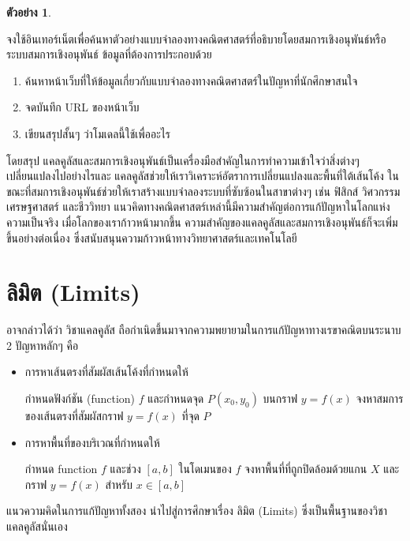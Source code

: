 \documentclass[
]{book}
\theoremstyle{definition}
\theoremstyle{definition}
\newtheorem{example}{ตัวอย่าง}[chapter]
\theoremstyle{definition}
\theoremstyle{definition}
\theoremstyle{remark}
\begin{document}
\begin{example}
\protect\hypertarget{exm:exm4}{}\label{exm:exm4}

จงใช้อินเทอร์เน็ตเพื่อค้นหาตัวอย่างแบบจำลองทางคณิตศาสตร์ที่อธิบายโดยสมการเชิงอนุพันธ์หรือระบบสมการเชิงอนุพันธ์ ข้อมูลที่ต้องการประกอบด้วย

\begin{enumerate}
\def\labelenumi{\arabic{enumi}.}
\item
  ค้นหาหน้าเว็บที่ให้ข้อมูลเกี่ยวกับแบบจำลองทางคณิตศาสตร์ในปัญหาที่นักศึกษาสนใจ
\item
  จดบันทึก URL ของหน้าเว็บ
\item
  เขียนสรุปสั้นๆ ว่าโมเดลนี้ใช้เพื่ออะไร
\end{enumerate}

\end{example}

โดยสรุป แคลคูลัสและสมการเชิงอนุพันธ์เป็นเครื่องมือสำคัญในการทำความเข้าใจว่าสิ่งต่างๆ เปลี่ยนแปลงไปอย่างไรและ แคลคูลัสช่วยให้เราวิเคราะห์อัตราการเปลี่ยนแปลงและพื้นที่ใต้เส้นโค้ง ในขณะที่สมการเชิงอนุพันธ์ช่วยให้เราสร้างแบบจำลองระบบที่ซับซ้อนในสาขาต่างๆ เช่น ฟิสิกส์ วิศวกรรม เศรษฐศาสตร์ และชีววิทยา แนวคิดทางคณิตศาสตร์เหล่านี้มีความสำคัญต่อการแก้ปัญหาในโลกแห่งความเป็นจริง เมื่อโลกของเราก้าวหน้ามากขึ้น ความสำคัญของแคลคูลัสและสมการเชิงอนุพันธ์ก็จะเพิ่มขึ้นอย่างต่อเนื่อง ซึ่งสนับสนุนความก้าวหน้าทางวิทยาศาสตร์และเทคโนโลยี

\chapter{ลิมิต (Limits)}\label{uxe25uxe21uxe15-limits}

อาจกล่าวได้ว่า วิชาแคลคูลัส
ถือกำเนิดขึ้นมาจากความพยายามในการแก้ปัญหาทางเรขาคณิตบนระนาบ 2 ปัญหาหลักๆ คือ

\begin{itemize}
\item
  การหาเส้นตรงที่สัมผัสเส้นโค้งที่กำหนดให้

  กำหนดฟังก์ชัน (function) \(f\) และกำหนดจุด \(P(x_{0},y_{0})\) บนกราฟ
  \(y = f(x)\) จงหาสมการของเส้นตรงที่สัมผัสกราฟ \(y = f(x)\) ที่จุด \(P\)
\item
  การหาพื้นที่ของบริเวณที่กำหนดให้

  กำหนด function \(f\) และช่วง \([a,b]\) ในโดเมนของ \(f\)
  จงหาพื้นที่ที่ถูกปิดล้อมด้วยแกน \(X\) และกราฟ \(y = f(x)\) สำหรับ \(x \in [a,b]\)
\end{itemize}

แนวความคิดในการแก้ปัญหาทั้งสอง นำไปสู่การศึกษาเรื่อง ลิมิต (Limits)
ซึ่งเป็นพื้นฐานของวิชาแคลคูลัสนั่นเอง
\end{document}
